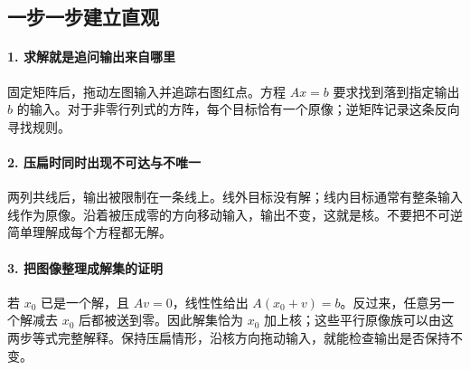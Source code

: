 \subsection*{一步一步建立直观}

\paragraph{1. 求解就是追问输出来自哪里}

固定矩阵后，拖动左图输入并追踪右图红点。方程 $Ax=b$ 要求找到落到指定输出 $b$ 的输入。对于非零行列式的方阵，每个目标恰有一个原像；逆矩阵记录这条反向寻找规则。



\paragraph{2. 压扁时同时出现不可达与不唯一}

两列共线后，输出被限制在一条线上。线外目标没有解；线内目标通常有整条输入线作为原像。沿着被压成零的方向移动输入，输出不变，这就是核。不要把不可逆简单理解成每个方程都无解。



\paragraph{3. 把图像整理成解集的证明}

若 $x_0$ 已是一个解，且 $Av=0$，线性性给出 $A(x_0+v)=b$。反过来，任意另一个解减去 $x_0$ 后都被送到零。因此解集恰为 $x_0$ 加上核；这些平行原像族可以由这两步等式完整解释。保持压扁情形，沿核方向拖动输入，就能检查输出是否保持不变。
